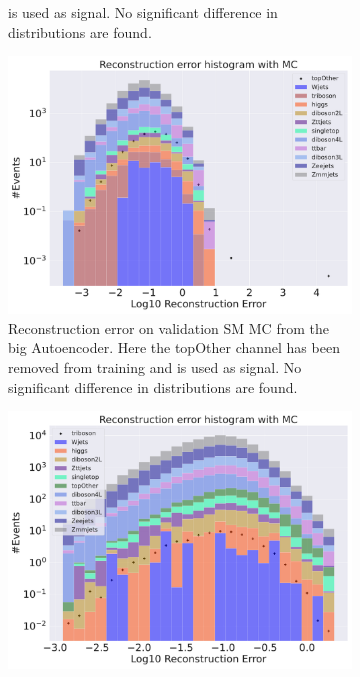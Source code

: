 \begin{figure}[H]
\begin{subfigure}{.45\textwidth}
{        is used as signal. No significant difference in distributions are found. }
        \label{fig:vae_small_topOther}
    \end{subfigure}
    \hfill
    \begin{subfigure}{.45\textwidth}
        \includegraphics[width=\textwidth]{Figures/VAE_testing/big/b_data_recon_big_rm3_feats_sig_topOther.pdf}
        \caption{Reconstruction error on validation SM MC from the big Autoencoder. Here the topOther channel has been removed from training and 
        is used as signal. No significant difference in distributions are found. }
        \label{fig:vae_big_topOther}
    \end{subfigure}
    \hfill
    \begin{subfigure}{.45\textwidth}
        \includegraphics[width=\textwidth]{Figures/VAE_testing/small/b_data_recon_big_rm3_feats_sig_triboson.pdf}

\end{subfigure}
\end{figure}
